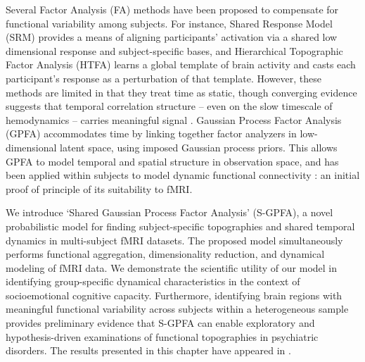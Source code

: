 Several Factor Analysis (FA) methods have been proposed to compensate for functional variability among subjects. For instance, Shared Response Model (SRM) \cite{srm} provides a means of aligning participants’ activation via a shared low dimensional response and subject-specific bases, and Hierarchical Topographic Factor Analysis (HTFA) \cite{htfa} learns a global template of brain activity and casts each participant’s response as a perturbation of that template. However, these methods are limited in that they treat time as static, though converging evidence suggests that temporal correlation structure -- even on the slow timescale of hemodynamics -- carries meaningful signal \cite{infraslow}. Gaussian Process Factor Analysis (GPFA) \cite{gpfa} accommodates time by linking together factor analyzers in low-dimensional latent space, using imposed Gaussian process priors. This allows GPFA to model temporal and spatial structure in observation space, and has been applied within subjects to model dynamic functional connectivity \cite{lfgp}: an initial proof of principle of its suitability to fMRI.


We introduce ‘Shared Gaussian Process Factor Analysis’ (S-GPFA), a novel probabilistic model for finding subject-specific topographies and shared temporal dynamics in multi-subject fMRI datasets. The proposed model simultaneously performs functional aggregation, dimensionality reduction, and dynamical modeling of fMRI data. We demonstrate the scientific utility of our model in identifying group-specific dynamical characteristics in the context of socioemotional cognitive capacity. Furthermore, identifying brain regions with meaningful functional variability across subjects within a heterogeneous sample provides preliminary evidence that S-GPFA can enable exploratory and hypothesis-driven examinations of functional topographies in psychiatric disorders.
The results presented in this chapter have appeared in \cite{ebrahimi2023time}.

